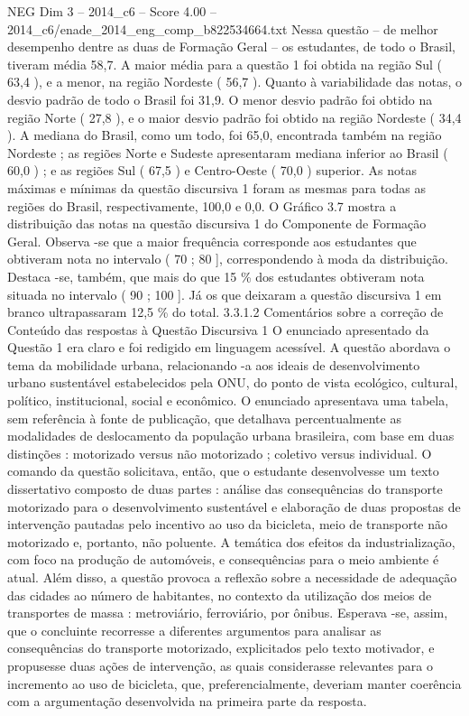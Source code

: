 \begin{textsample}{NEG Dim 3 – 2014\_c6 – Score 4.00 – 2014\_c6/enade\_2014\_eng\_comp\_b822534664.txt}
Nessa questão – de melhor desempenho dentre as duas de Formação Geral – os estudantes, de todo o Brasil, tiveram média 58,7.
A maior média para a questão 1 foi obtida na região Sul ( 63,4 ), e a menor, na região Nordeste ( 56,7 ).
Quanto à variabilidade das notas, o desvio padrão de todo o Brasil foi 31,9.
O menor desvio padrão foi obtido na região Norte ( 27,8 ), e o maior desvio padrão foi obtido na região Nordeste ( 34,4 ).
A mediana do Brasil, como um todo, foi 65,0, encontrada também na região Nordeste ; as regiões Norte e Sudeste apresentaram mediana inferior ao Brasil ( 60,0 ) ; e as regiões Sul ( 67,5 ) e Centro-Oeste ( 70,0 ) superior.
As notas máximas e mínimas da questão discursiva 1 foram as mesmas para todas as regiões do Brasil, respectivamente, 100,0 e 0,0.
O Gráfico 3.7 mostra a distribuição das notas na questão discursiva 1 do Componente de Formação Geral.
Observa -se que a maior frequência corresponde aos estudantes que obtiveram nota no intervalo ( 70 ; 80 ], correspondendo à moda da distribuição.
Destaca -se, também, que mais do que 15 \% dos estudantes obtiveram nota situada no intervalo ( 90 ; 100 ].
Já os que deixaram a questão discursiva 1 em branco ultrapassaram 12,5 \% do total. 3.3.1.2 Comentários sobre a correção de Conteúdo das respostas à Questão Discursiva 1 O enunciado apresentado da Questão 1 era claro e foi redigido em linguagem acessível.
A questão abordava o tema da mobilidade urbana, relacionando -a aos ideais de desenvolvimento urbano sustentável estabelecidos pela ONU, do ponto de vista ecológico, cultural, político, institucional, social e econômico.
O enunciado apresentava uma tabela, sem referência à fonte de publicação, que detalhava percentualmente as modalidades de deslocamento da população urbana brasileira, com base em duas distinções : motorizado versus não motorizado ; coletivo versus individual.
O comando da questão solicitava, então, que o estudante desenvolvesse um texto dissertativo composto de duas partes : análise das consequências do transporte motorizado para o desenvolvimento sustentável e elaboração de duas propostas de intervenção pautadas pelo incentivo ao uso da bicicleta, meio de transporte não motorizado e, portanto, não poluente.
A temática dos efeitos da industrialização, com foco na produção de automóveis, e consequências para o meio ambiente é atual.
Além disso, a questão provoca a reflexão sobre a necessidade de adequação das cidades ao número de habitantes, no contexto da utilização dos meios de transportes de massa : metroviário, ferroviário, por ônibus.
Esperava -se, assim, que o concluinte recorresse a diferentes argumentos para analisar as consequências do transporte motorizado, explicitados pelo texto motivador, e propusesse duas ações de intervenção, as quais considerasse relevantes para o incremento ao uso de bicicleta, que, preferencialmente, deveriam manter coerência com a argumentação desenvolvida na primeira parte da resposta.

\end{textsample}
